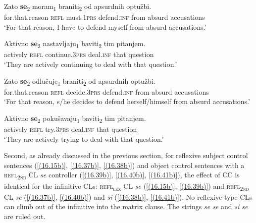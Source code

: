 \begin{exe}\ex\label{(16.26b)}
\gll Zato \textbf{se}\textsubscript{2} moram\textsubscript{1} braniti\textsubscript{2} od apsurdnih optužbi. \\
 for.that.reason \textsc{refl} must.1\textsc{prs} defend.\textsc{inf} from absurd accusations \\
\glt ‘For that reason, I have to defend myself from absurd accusations.’

\ex\label{(16.27b)}
\gll Aktivno \textbf{se}\textsubscript{2} nastavljaju\textsubscript{1} baviti\textsubscript{2} tim pitanjem. \\
 actively \textsc{refl} continue.3\textsc{prs} deal.\textsc{inf} that question \\
\glt ‘They are actively continuing to deal with that question.’

\ex\label{(16.28b)}
\gll Zato \textbf{se}\textsubscript{2} odlučuje\textsubscript{1} braniti\textsubscript{2} od apsurdnih optužbi. \\
 for.that.reason \textsc{refl} decide.3\textsc{prs} defend.\textsc{inf} from absurd accusations \\
\glt ‘For that reason, s/he decides to defend herself/himself from absurd accusations.’

\ex\label{(16.29b)}
\gll Aktivno \textbf{se}\textsubscript{2} pokušavaju\textsubscript{1} baviti\textsubscript{2} tim pitanjem. \\
 actively \textsc{refl} try.3\textsc{prs} deal.\textsc{inf} that question \\
\glt ‘They are actively trying to deal with that question.’
\hfill 
\end{exe}

\noindent Second, as already discussed in the previous section, for reflexive subject control sentences (\ref{(16.15b)}, \ref{(16.37b)}, \ref{(16.38b)}) and object control sentences with a \textsc{refl\textsubscript{2nd}} CL \textit{se} controller (\ref{(16.39b)}, \ref{(16.40b)}, \ref{(16.41b)}), the effect of CC is identical for the infinitive CLs: \textsc{refl\textsubscript{\textsc{lex}}} CL \textit{se} (\ref{(16.15b)}, \ref{(16.39b)}) and \textsc{refl\textsubscript{2nd}} CL \textit{se} (\ref{(16.37b)}, \ref{(16.40b)}) and \textit{si} (\ref{(16.38b)}, \ref{(16.41b)}). No reflexive-type CLs can climb out of the infinitive into the matrix clause. The strings \textit{se se} and \textit{si se} are ruled out. 

